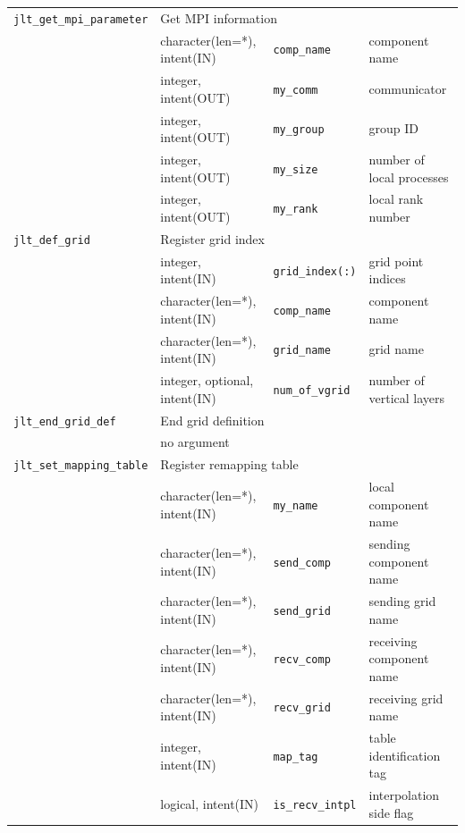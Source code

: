 \documentclass[11pt,a4paper]{report}
\begin{document}
\begin{table}[H]
\begin{center}
{\begin{tabular}{llll}
\hline
 \texttt{jlt\_get\_mpi\_parameter} & \multicolumn{3}{l}{Get MPI information} \\
                & character(len=*), intent(IN) & \texttt{comp\_name} & component name\\
                & integer, intent(OUT) & \texttt{my\_comm} & communicator\\
                & integer, intent(OUT) & \texttt{my\_group} & group ID\\
                & integer, intent(OUT) & \texttt{my\_size} & number of local processes\\
                & integer, intent(OUT) & \texttt{my\_rank} & local rank number\\
\hline
 \texttt{jlt\_def\_grid} & \multicolumn{3}{l}{Register grid index} \\
                & integer, intent(IN) & \texttt{grid\_index(:)} & grid point indices\\
                & character(len=*), intent(IN) & \texttt{comp\_name} & component name\\
                & character(len=*), intent(IN) & \texttt{grid\_name} & grid name\\
                & integer, optional, intent(IN) & \texttt{num\_of\_vgrid} & number of vertical layers\\
\hline
 \texttt{jlt\_end\_grid\_def} &  \multicolumn{3}{l}{End grid definition}\\
                & \multicolumn{3}{l}{no argument} \\
\hline
 \texttt{jlt\_set\_mapping\_table} & \multicolumn{3}{l}{Register remapping table} \\
                & character(len=*), intent(IN) & \texttt{my\_name} & local component name\\
                & character(len=*), intent(IN) & \texttt{send\_comp} & sending component name\\
                & character(len=*), intent(IN) & \texttt{send\_grid} & sending grid name\\
                & character(len=*), intent(IN) & \texttt{recv\_comp} & receiving component name\\
                & character(len=*), intent(IN) & \texttt{recv\_grid} & receiving grid name\\
                & integer, intent(IN) & \texttt{map\_tag} & table identification tag\\
                & logical, intent(IN) & \texttt{is\_recv\_intpl} & interpolation side flag\\

\end{tabular}}
\end{center}
\end{table}
\end{document}
